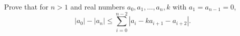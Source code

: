 Prove that for $n>1$ and real numbers $a_0,a_1,\dots, a_n,k$ with $a_1=a_{n-1}=0$, \[|a_0|-|a_n|\leq \sum_{i=0}^{n-2}|a_i-ka_{i+1}-a_{i+2}|.\]